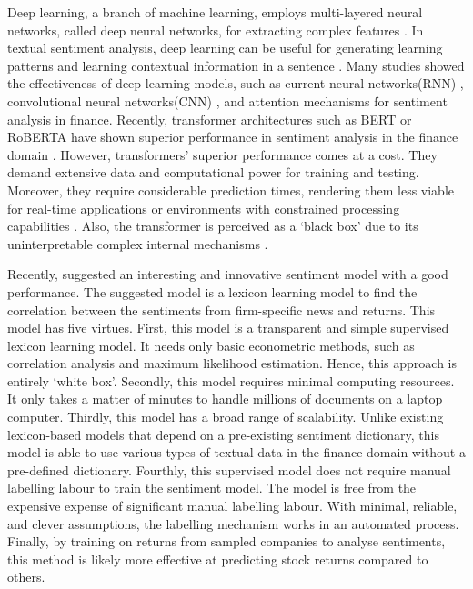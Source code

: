 \documentclass[logo,bsc,singlespacing,parskip]{infthesis}
\begin{document}
Deep learning, a branch of machine learning, employs multi-layered neural networks, called deep neural networks, for extracting complex features \cite{IBMDeepLearning}. In textual sentiment analysis, deep learning can be useful for generating learning patterns and learning contextual information in a sentence \cite{Zhang2018}. Many studies showed the effectiveness of deep learning models, such as current neural networks(RNN) \cite{Tang2015, Tai2015}, convolutional neural networks(CNN) \cite{Kim2014, Zhang2015, Johnson2017}, and attention mechanisms \cite{Sohangir2018, Yang2016} for sentiment analysis in finance. Recently, transformer architectures such as BERT or RoBERTA have shown superior performance in sentiment analysis in the finance domain \cite{Mishev2020}. However, transformers’ superior performance comes at a cost. They demand extensive data and computational power for training and testing. Moreover, they require considerable prediction times, rendering them less viable for real-time applications or environments with constrained processing capabilities \cite{Rizinski2024}. Also, the transformer is perceived as a ‘black box’ due to its uninterpretable complex internal mechanisms \cite{Dobson2023}. 

Recently, \cite{ke2020predicting} suggested an interesting and innovative sentiment model with a good performance. The suggested model is a lexicon learning model to find the correlation between the sentiments from firm-specific news and returns. This model has five virtues. First, this model is a transparent and simple supervised lexicon learning model. It needs only basic econometric methods, such as correlation analysis and maximum likelihood estimation. Hence, this approach is entirely ‘white box’. Secondly, this model requires minimal computing resources. It only takes a matter of minutes to handle millions of documents on a laptop computer. 
Thirdly, this model has a broad range of scalability. Unlike existing lexicon-based models that depend on a pre-existing sentiment dictionary, this model is able to use various types of textual data in the finance domain without a pre-defined dictionary. Fourthly, this supervised model does not require manual labelling labour to train the sentiment model. The model is free from the expensive expense of significant manual labelling labour. With minimal, reliable, and clever assumptions, the labelling mechanism works in an automated process. Finally, by training on returns from sampled companies to analyse sentiments, this method is likely more effective at predicting stock returns compared to others.
\end{document}
